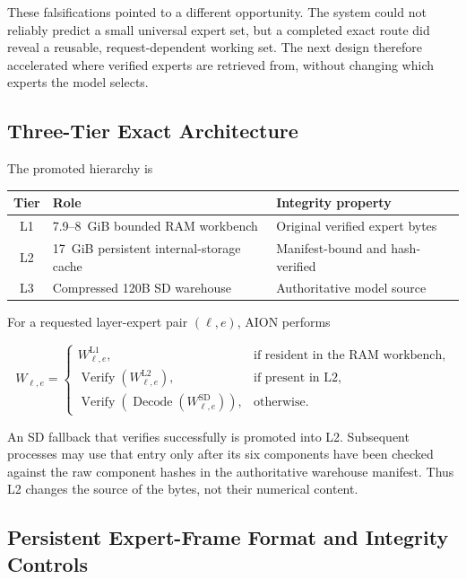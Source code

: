 These falsifications pointed to a different opportunity.  The system could not
reliably predict a small universal expert set, but a completed exact route did
reveal a reusable, request-dependent working set.  The next design therefore
accelerated where verified experts are retrieved from, without changing which
experts the model selects.

\subsection{Three-Tier Exact Architecture}

The promoted hierarchy is

\begin{center}
\begin{tabular}{@{}cll@{}}
\toprule
Tier & Role & Integrity property \\
\midrule
L1 & 7.9--8~GiB bounded RAM workbench & Original verified expert bytes \\
L2 & 17~GiB persistent internal-storage cache & Manifest-bound and hash-verified \\
L3 & Compressed 120B SD warehouse & Authoritative model source \\
\bottomrule
\end{tabular}
\end{center}

For a requested layer-expert pair $(\ell,e)$, AION performs

\[
W_{\ell,e} =
\begin{cases}
W^{\mathrm{L1}}_{\ell,e}, & \text{if resident in the RAM workbench},\\
\operatorname{Verify}(W^{\mathrm{L2}}_{\ell,e}), & \text{if present in L2},\\
\operatorname{Verify}\!\left(\operatorname{Decode}
  (W^{\mathrm{SD}}_{\ell,e})\right), & \text{otherwise}.
\end{cases}
\]

An SD fallback that verifies successfully is promoted into L2.  Subsequent
processes may use that entry only after its six components have been checked
against the raw component hashes in the authoritative warehouse manifest.
Thus L2 changes the source of the bytes, not their numerical content.

\subsection{Persistent Expert-Frame Format and Integrity Controls}

